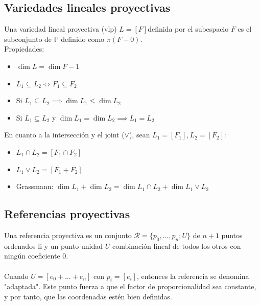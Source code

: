 \documentclass{myclass}
\newcommand{\K}{\mathbb{K}}
\renewcommand{\P}{\mathbb{P}}
\newcommand{\Rcal}{\mathcal{R}}
\begin{document}



\subsection{Variedades lineales proyectivas}
Una variedad lineal proyectiva (vlp) $L = [F]$definida por el subespacio $F$ es el subconjunto de $\P$ definido como $\pi(F-{0})$. \\
Propiedades:
\begin{itemize}
 \item $\dim L = \dim F - 1$
 \item $L_1 \subseteq L_2 \iff F_1\subseteq F_2$
 \item Si $L_1\subseteq L_2 \implies \dim L_1 \leq \dim L_2$
 \item Si $L_1 \subseteq L_2 $ y $\dim L_1 = \dim L_2 \implies L_1 = L_2$
\end{itemize}
En cuanto a la intersección y el joint ($\vee$), sean $L_1 = [F_1], L_2 = [F_2]$:
\begin{itemize}
 \item $L_1\cap L_2 = [F_1\cap F_2]$
 \item $L_1\vee L_2 = [F_1 + F_2]$
 \item Grassmann: $ \dim L_1 + \dim L_2 = \dim L_1\cap L_2 + \dim L_1\vee L_2$
\end{itemize}

\subsection{Referencias proyectivas}
Una referencia proyectiva es un conjunto $\Rcal = \{p_0, \ldots, p_n; U\}$ de $n+1$ puntos ordenados li y un punto unidad $U$ combinación lineal de todos los otros con ningún coeficiente 0. \\
\\
Cuando $U = [e_0 + \ldots + e_n]$ con $p_i = [e_i]$, entonces la referencia se denomina "adaptada". Este punto fuerza a que el factor de proporcionalidad sea constante, y por tanto, que las coordenadas estén bien definidas.
\end{document}
